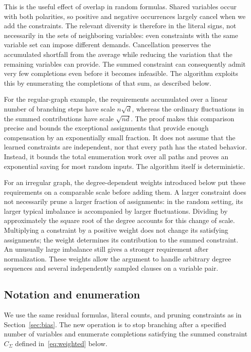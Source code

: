 \documentclass[11pt,a4paper]{article}
\theoremstyle{definition}
\theoremstyle{remark}
\begin{document}
This is the useful effect of overlap in random formulas. Shared variables
occur with both polarities, so positive and negative occurrences largely
cancel when we add the constraints. The relevant diversity is therefore
in the literal signs, not necessarily in the sets of neighboring variables:
even constraints with the same variable set can impose different demands.
Cancellation preserves the accumulated shortfall from the average while
reducing the variation that the remaining variables can provide. The
summed constraint can consequently admit very few completions even before
it becomes infeasible. The algorithm exploits this by enumerating the
completions of that sum, as described below.

For the regular-graph example, the requirements accumulated over a linear
number of branching steps have scale $n\sqrt d$, whereas the ordinary
fluctuations in the summed contributions have scale $\sqrt{nd}$. The proof
makes this comparison precise and bounds the exceptional assignments that
provide enough compensation by an exponentially small fraction. It does
not assume that the learned constraints are independent, nor that every
path has the stated behavior. Instead, it bounds the total enumeration
work over all paths and proves an exponential saving for most random
inputs. The algorithm itself is deterministic.

For an irregular graph, the degree-dependent weights introduced below
put these requirements on a comparable scale before adding them. A larger
constraint does not necessarily prune a larger fraction of assignments:
in the random setting, its larger typical imbalance is accompanied by
larger fluctuations. Dividing by approximately the square root of the
degree accounts for this change of scale. Multiplying a constraint by a
positive weight does not change its satisfying assignments; the weight
determines its contribution to the summed constraint. An unusually large
imbalance still gives a stronger requirement after normalization. These
weights allow the argument to handle arbitrary degree sequences and
several independently sampled clauses on a variable pair.

\subsection{Notation and enumeration}\label{sec:enumeration}

We use the same residual formulas, literal counts, and pruning constraints
as in Section~\ref{sec:bias}. The new operation is to stop branching after
a specified number of variables and enumerate completions satisfying the
summed constraint $C_\Sigma$ defined in~\eqref{eq:weighted} below.
\end{document}
